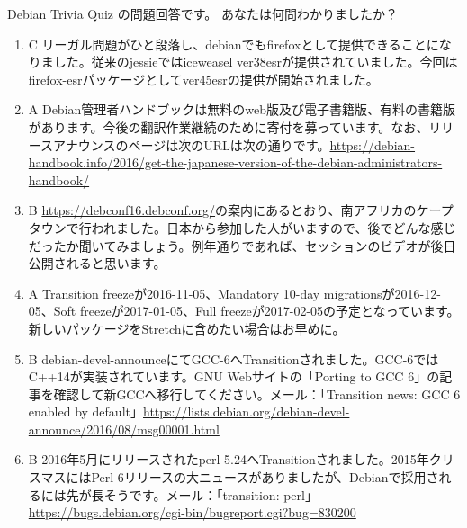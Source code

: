 \documentclass[mingoth,a4paper]{jsarticle}
\begin{document}

 Debian Trivia Quiz の問題回答です。
 あなたは何問わかりましたか？ \\
 \begin{enumerate}
 \item C リーガル問題がひと段落し、debianでもfirefoxとして提供できることになりました。従来のjessieではiceweasel ver38esrが提供されていました。今回はfirefox-esrパッケージとしてver45esrの提供が開始されました。\\
 \item A Debian管理者ハンドブックは無料のweb版及び電子書籍版、有料の書籍版があります。今後の翻訳作業継続のために寄付を募っています。なお、リリースアナウンスのページは次のURLは次の通りです。\url {https://debian-handbook.info/2016/get-the-japanese-version-of-the-debian-administrators-handbook/}\\
\item  B \url {https://debconf16.debconf.org/}の案内にあるとおり、南アフリカのケープタウンで行われました。日本から参加した人がいますので、後でどんな感じだったか聞いてみましょう。例年通りであれば、セッションのビデオが後日公開されると思います。\\
\item  A Transition freezeが2016-11-05、Mandatory 10-day migrationsが2016-12-05、Soft freezeが2017-01-05、Full freezeが2017-02-05の予定となっています。新しいパッケージをStretchに含めたい場合はお早めに。\\
\item  B debian-devel-announceにてGCC-6へTransitionされました。GCC-6ではC++14が実装されています。GNU Webサイトの「Porting to GCC 6」の記事を確認して新GCCへ移行してください。メール：「Transition news: GCC 6 enabled by default」\url {https://lists.debian.org/debian-devel-announce/2016/08/msg00001.html}\\
\item  B 2016年5月にリリースされたperl-5.24へTransitionされました。2015年クリスマスにはPerl-6リリースの大ニュースがありましたが、Debianで採用されるには先が長そうです。メール：「transition: perl」\url {https://bugs.debian.org/cgi-bin/bugreport.cgi?bug=830200}\\

\end{enumerate}
\end{document}
